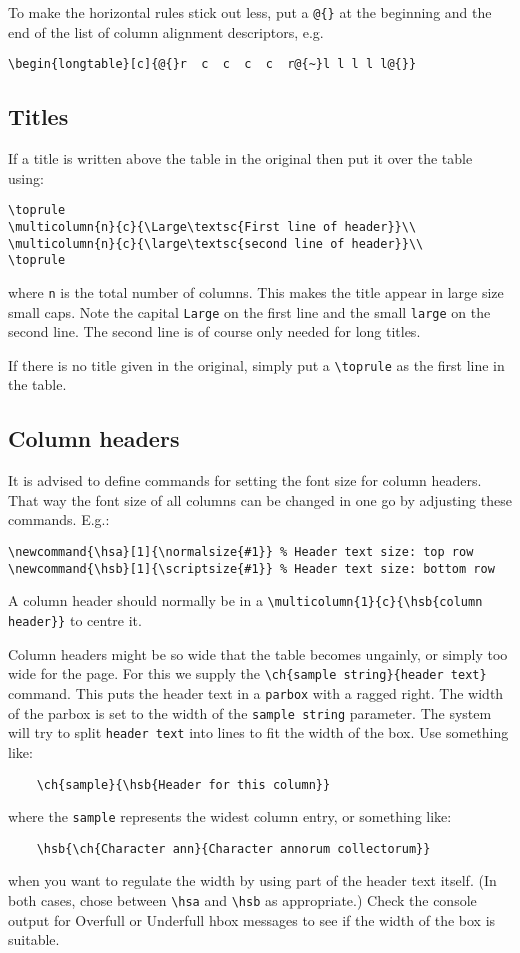 \documentclass{report}
\begin{document}
To make the horizontal rules stick out less, put a \verb+@{}+ at the beginning
and the end of the list of column alignment descriptors, e.g.
\begin{verbatim}
\begin{longtable}[c]{@{}r  c  c  c  c  r@{~}l l l l l@{}}
\end{verbatim}

\subsection{Titles}
If a title is written above the table in the original then put it over the
table using:
\begin{verbatim}
\toprule
\multicolumn{n}{c}{\Large\textsc{First line of header}}\\
\multicolumn{n}{c}{\large\textsc{second line of header}}\\
\toprule
\end{verbatim}
where \verb+n+ is the total number of columns.
This makes the title appear in large size small caps.
Note the capital \verb+Large+
on the first line and the small \verb+large+ on the second line.
The second line is of course only needed for long titles.

If there is no title given in the original, simply put a \verb+\toprule+
as the first line in the table.

\subsection{Column headers}
It is advised to define commands for setting the font size for column headers.
That way the font size of all columns can be changed in one go by adjusting
these commands. E.g.:
\begin{verbatim}
\newcommand{\hsa}[1]{\normalsize{#1}} % Header text size: top row
\newcommand{\hsb}[1]{\scriptsize{#1}} % Header text size: bottom row
\end{verbatim}

A column header should normally be in a
\verb+\multicolumn{1}{c}{\hsb{column header}}+
to centre it.

Column headers might be so wide that the table becomes ungainly, or simply
too wide for the page.
For this we supply the \verb+\ch{sample string}{header text}+ command.
This puts the header text in a \verb+parbox+ with a ragged right.
The width of the parbox is set to the width of the \verb+sample string+
parameter.
The system will try to split \verb+header text+ into lines to fit
the width of the box. Use something like:
\begin{verbatim}
	\ch{sample}{\hsb{Header for this column}}
\end{verbatim}
where the \verb+sample+ represents the widest column entry, or something like:
\begin{verbatim}
	\hsb{\ch{Character ann}{Character annorum collectorum}}
\end{verbatim}
when you want to regulate the width by using part of the header text itself.
(In both cases, chose between \verb+\hsa+ and \verb+\hsb+ as appropriate.)
Check the console output for Overfull or Underfull hbox messages to see
if the width of the box is suitable.
\end{document}
